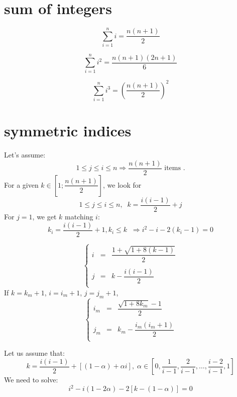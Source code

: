 \documentclass[aps,onecolumn,11pt]{revtex4}
\begin{document}
\section{sum of integers}
\begin{equation}
	\sum_{i=1}^n i = \dfrac{n(n+1)}{2}
\end{equation}

\begin{equation}
	\sum_{i=1}^n i^2 = \dfrac{n(n+1)(2n+1)}{6}
\end{equation}

\begin{equation}
	\sum_{i=1}^n i^3 = \left(\dfrac{n(n+1)}{2}\right)^2
\end{equation}

\section{symmetric indices}

Let's assume:
\begin{equation}
	1\leq j \leq i \leq n \Rightarrow \dfrac{n(n+1)}{2} \text{ items }.
\end{equation}
For a given $k\in \left[ 1;\dfrac{n(n+1)}{2}\right]$, we look for
\begin{equation}
	1\leq j \leq i \leq n, \;\; k = \frac{i(i-1)}{2}+j
\end{equation}
For $j=1$, we get $k$ matching $i$:
\begin{equation}
	k_i=\dfrac{i(i-1)}{2}+1, k_i\leq k \; \; \Rightarrow i^2-i - 2(k_i-1) = 0
\end{equation}

\begin{equation}
\left\lbrace
	\begin{array}{rcl}
	i &=& \dfrac{1+\sqrt{1+8(k-1)}}{2}\\
	\\
	j &=& k-\dfrac{i(i-1)}{2}\\
	\end{array}
\right.
\end{equation}
If $k=k_m+1$, $i=i_m+1$, $j=j_m+1$,
\begin{equation}
	\left\lbrace
	\begin{array}{rcl}
	i_m &=& \dfrac{\sqrt{1+8k_m}-1}{2}\\
	\\
	j_m &=& k_m -\dfrac{i_m(i_m+1)}{2}\\
	\end{array}
\right.
\end{equation}

Let us assume that:
\begin{equation}
	k = \dfrac{i(i-1)}{2} + \left[ (1-\alpha) + \alpha i \right], \;\alpha\in\left[0,\dfrac{1}{i-1},\dfrac{2}{i-1},\ldots,\dfrac{i-2}{i-1},1\right]
\end{equation}
We need to solve:
\begin{equation}
	i^2 - i(1-2\alpha) - 2\left[ k - (1-\alpha) \right] = 0	
\end{equation}
 	
\end{document}
